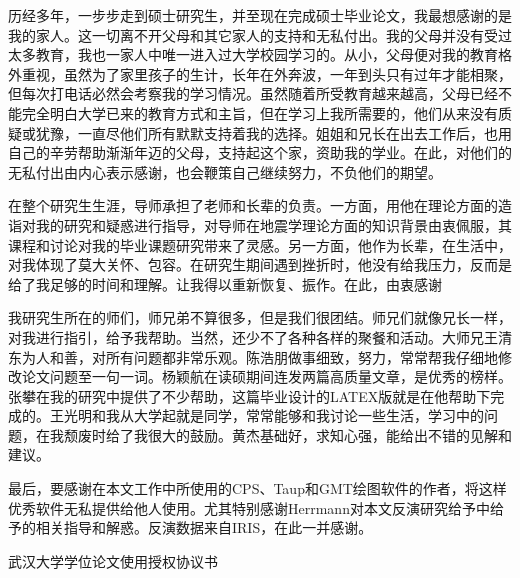 

\acknowledgement

历经多年，一步步走到硕士研究生，并至现在完成硕士毕业论文，我最想感谢的是我的家人。这一切离不开父母和其它家人的支持和无私付出。我的父母并没有受过太多教育，我也一家人中唯一进入过大学校园学习的。从小，父母便对我的教育格外重视，虽然为了家里孩子的生计，长年在外奔波，一年到头只有过年才能相聚，但每次打电话必然会考察我的学习情况。虽然随着所受教育越来越高，父母已经不能完全明白大学已来的教育方式和主旨，但在学习上我所需要的，他们从来没有质疑或犹豫，一直尽他们所有默默支持着我的选择。姐姐和兄长在出去工作后，也用自己的辛劳帮助渐渐年迈的父母，支持起这个家，资助我的学业。在此，对他们的无私付出由内心表示感谢，也会鞭策自己继续努力，不负他们的期望。

在整个研究生生涯，导师承担了老师和长辈的负责。一方面，用他在理论方面的造诣对我的研究和疑惑进行指导，对导师在地震学理论方面的知识背景由衷佩服，其课程和讨论对我的毕业课题研究带来了灵感。另一方面，他作为长辈，在生活中，对我体现了莫大关怀、包容。在研究生期间遇到挫折时，他没有给我压力，反而是给了我足够的时间和理解。让我得以重新恢复、振作。在此，由衷感谢

我研究生所在的师们，师兄弟不算很多，但是我们很团结。师兄们就像兄长一样，对我进行指引，给予我帮助。当然，还少不了各种各样的聚餐和活动。大师兄王清东为人和善，对所有问题都非常乐观。陈浩朋做事细致，努力，常常帮我仔细地修改论文问题至一句一词。杨颖航在读硕期间连发两篇高质量文章，是优秀的榜样。张攀在我的研究中提供了不少帮助，这篇毕业设计的LATEX版就是在他帮助下完成的。王光明和我从大学起就是同学，常常能够和我讨论一些生活，学习中的问题，在我颓废时给了我很大的鼓励。黄杰基础好，求知心强，能给出不错的见解和建议。

最后，要感谢在本文工作中所使用的CPS、Taup和GMT绘图软件的作者，将这样优秀软件无私提供给他人使用。尤其特别感谢Herrmann对本文反演研究给予中给予的相关指导和解惑。反演数据来自IRIS，在此一并感谢。




\cleardoublepage
\newpage\vspace*{20pt}
\begin{center}{\heiti 武汉大学学位论文使用授权协议书}\end{center}
\par\vspace*{30pt}

